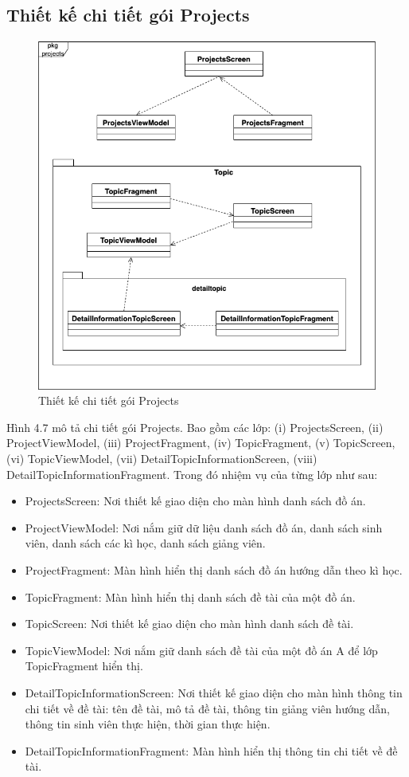 \documentclass[../Main.tex]{subfiles}
\begin{document}
\subsection{Thiết kế chi tiết gói Projects} 
\begin{figure}[H]
    \centering
    \includegraphics[width=0.75\linewidth]{Figure/package_diagram_projects.png}
    \caption{Thiết kế chi tiết gói Projects}
    \label{fig:use_case_tổng_quan}
\end{figure}
Hình 4.7 mô tả chi tiết gói Projects. Bao gồm các lớp: (i) ProjectsScreen, (ii) ProjectViewModel, (iii) ProjectFragment, (iv) TopicFragment, (v) TopicScreen, (vi) TopicViewModel, (vii) DetailTopicInformationScreen, (viii) DetailTopicInformationFragment. Trong đó nhiệm vụ của từng lớp như sau:
\begin{itemize}
    \item ProjectsScreen: Nơi thiết kế giao diện cho màn hình danh sách đồ án.
    \item ProjectViewModel: Nơi nắm giữ dữ liệu danh sách đồ án, danh sách sinh viên, danh sách các kì học, danh sách giảng viên.
    \item ProjectFragment: Màn hình hiển thị danh sách đồ án hướng dẫn theo kì học.
    \item TopicFragment: Màn hình hiển thị danh sách đề tài của một đồ án. 
    \item TopicScreen: Nơi thiết kế giao diện cho màn hình danh sách đề tài.
    \item TopicViewModel: Nơi nắm giữ danh sách đề tài của một đồ án A để lớp TopicFragment hiển thị.
    \item DetailTopicInformationScreen: Nơi thiết kế giao diện cho màn hình thông tin chi tiết về đề tài: tên đề tài, mô tả đề tài, thông tin giảng viên hướng dẫn, thông tin sinh viên thực hiện, thời gian thực hiện.
    \item DetailTopicInformationFragment: Màn hình hiển thị thông tin chi tiết về đề tài. 
\end{itemize}
\end{document}
